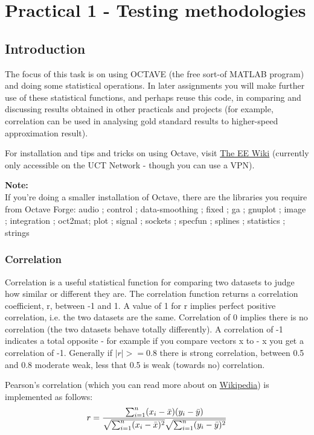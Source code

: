 \section{Practical 1 - Testing methodologies}
\label{sec:Prac1}
\subsection{Introduction}
The focus of this task is on using OCTAVE (the free sort-of MATLAB program) and doing some statistical operations. In later assignments you will make further use of these statistical functions, and perhaps reuse this code, in comparing and discussing results obtained in other practicals and projects (for example, correlation can be used in analysing gold standard results to higher-speed approximation result).

For installation and tips and tricks on using Octave, visit \href{http://wiki.ee.uct.ac.za/Octave}{The EE Wiki} (currently only accessible on the UCT Network - though you can use a VPN).

\textbf{Note:}\\
If you're doing a smaller installation of Octave, there are the libraries you require from Octave Forge:
audio ; control ; data-smoothing ; fixed ; ga ; gnuplot ; image ; integration ; oct2mat; plot ; signal ; sockets ; specfun ; splines ; statistics ; strings


\subsubsection{Correlation}
Correlation is a useful statistical function for comparing two datasets to judge how similar or different they are. The correlation function returns a correlation coefficient, r, between -1 and 1. A value of 1 for r implies perfect positive correlation, i.e. the two datasets are the same. Correlation of 0 implies there is no correlation (the two datasets behave totally differently). A correlation of -1 indicates a total opposite - for example if you compare vectors x to - x you get a correlation of -1. Generally if $|r| >= 0.8$ there is strong correlation, between 0.5 and 0.8 moderate weak, less that 0.5 is weak (towards no) correlation.

Pearson's correlation (which you can read more about on \href{https://en.wikipedia.org/wiki/Pearson_correlation_coefficient}{Wikipedia}) is implemented as follows:
\begin{equation}
\label{eqn:Pearson}
  r =
  \frac{ \sum_{i=1}^{n}(x_i-\bar{x})(y_i-\bar{y}) }{%
        \sqrt{\sum_{i=1}^{n}(x_i-\bar{x})^2}\sqrt{\sum_{i=1}^{n}(y_i-\bar{y})^2}}
\end{equation}

